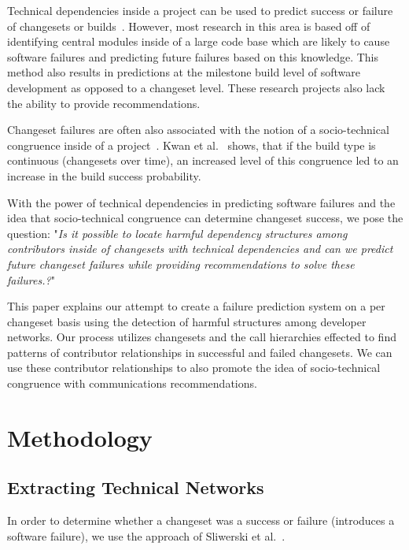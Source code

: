 \documentclass[conference]{IEEEtran}
\begin{document}
Technical dependencies inside a project can be used to predict success or failure of 
changesets or builds~\cite{Pinzger:2008:DNP, Zimmermann:2008:PDU}. However, most 
research in this area is based off of identifying
central modules inside of a large code base which are likely to cause software failures and 
predicting future failures based on this knowledge. This method also results in predictions 
at the milestone build level of software development as opposed to a changeset level.
These research projects also lack the ability to provide recommendations.

Changeset failures are often also associated with the notion of a socio-technical 
congruence inside of a project~\cite{Conway:1968}. Kwan et al.~\cite{Kwan:2011:SD} shows, 
that if the build type is continuous (changesets over time), an increased level of this
congruence led to an increase in the build success probability. 

With the power of technical dependencies in predicting software failures and the idea
that socio-technical congruence can determine changeset success, we pose the question: 
"\textit{Is it possible to locate harmful dependency structures among contributors inside
of changesets with technical dependencies and can we predict future changeset failures
while providing recommendations to solve these failures.?}"

This paper explains our attempt to create a failure prediction system on a per changeset basis using
the detection of harmful structures among developer networks.
Our process utilizes changesets and the call hierarchies effected  to find patterns of contributor 
relationships in successful and failed changesets.  We can use these contributor relationships 
to also promote the idea of socio-technical congruence with communications recommendations.


\section{Methodology}

\subsection{Extracting Technical Networks}
In order to determine whether a changeset was a success or failure (introduces a software
failure), we use the approach of Sliwerski et al.~\cite{Sliwerski:2005:CIF}.
\end{document}
